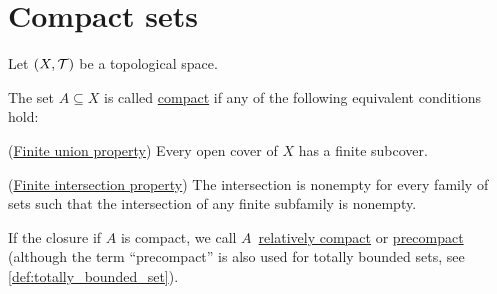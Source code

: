 \section{Compact sets}\label{sec:compact_sets}

Let $(X, \mathcal T)$ be a topological space.

\begin{definition}\label{def:compact_set}\cite[40]{Deimling1985}
  The set $A \subseteq X$ is called \ul{compact} if any of the following equivalent conditions hold:
  \begin{defenum}
    \item\label{def:compact_set/union} (\ul{Finite union property}) Every open cover of $X$ has a finite subcover.
    \item\label{def:compact_set/intersection} (\ul{Finite intersection property}) The intersection is nonempty for every family of sets such that the intersection of any finite subfamily is nonempty.
  \end{defenum}

  If the closure if $A$ is compact, we call $A$~\ul{relatively compact} or \ul{precompact} (although the term \enquote{precompact} is also used for totally bounded sets, see \ref{def:totally_bounded_set}).
\end{definition}
